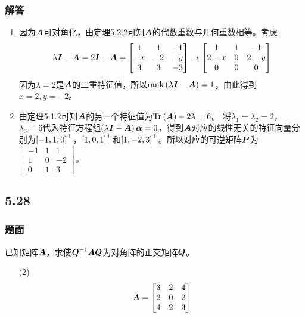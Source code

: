 \documentclass{beamer}
\begin{document}
\begin{frame}
    \frametitle{解答}
    \begin{enumerate}
        \item {
              因为\(\boldsymbol{A}\)可对角化，由定理5.2.2可知\(\boldsymbol{A}\)的代数重数与几何重数相等。考虑
              \begin{equation*}
                  \lambda\boldsymbol{I}-\boldsymbol{A}=2\boldsymbol{I}-\boldsymbol{A}=
                  \begin{bmatrix}
                      1  & 1  & -1 \\
                      -x & -2 & -y \\
                      3  & 3  & -3
                  \end{bmatrix}\to
                  \begin{bmatrix}
                      1   & 1 & -1  \\
                      2-x & 0 & 2-y \\
                      0   & 0 & 0
                  \end{bmatrix}
              \end{equation*}
              因为\(\lambda=2\)是\(\boldsymbol{A}\)的二重特征值，所以\(\mathrm{rank}\left( \lambda\boldsymbol{I}-\boldsymbol{A} \right)=1\)，由此得到\(x=2,y=-2\)。
              }\pause
        \item {
              由定理5.1.2可知\(\boldsymbol{A}\)的另一个特征值为\(\mathrm{Tr}\left( \boldsymbol{A} \right)-2\lambda=6\)。
              将\(\lambda_1=\lambda_2=2\)，\(\lambda_3=6\)代入特征方程组\(\left( \lambda\boldsymbol{I}-\boldsymbol{A} \right)\boldsymbol{\alpha}=0\)，得到\(\boldsymbol{A}\)对应的线性无关的特征向量分别为\(\left[ -1,1,0 \right]^\top\)，\(\left[ 1,0,1 \right]^\top\)和\(\left[ 1,-2,3 \right]^\top\)。所以对应的可逆矩阵\(\boldsymbol{P}\)为\(\begin{bmatrix}-1&1&1\\1&0&-2\\0&1&3\end{bmatrix}\)。
              }
    \end{enumerate}
\end{frame}

\subsection*{5.28}
\begin{frame}
    \frametitle{题面}
    已知矩阵\(\boldsymbol{A}\)，求使\({\boldsymbol{Q}}^{-1}\boldsymbol{A}\boldsymbol{Q}\)为对角阵的正交矩阵\(\boldsymbol{Q}\)。
    \begin{enumerate}
        \item[(2)]
            {
            \begin{equation*}
                \boldsymbol{A}=
                \begin{bmatrix}
                    3 & 2 & 4 \\
                    2 & 0 & 2 \\
                    4 & 2 & 3
                \end{bmatrix}
            \end{equation*}
            }
    \end{enumerate}
\end{frame}
\end{document}
